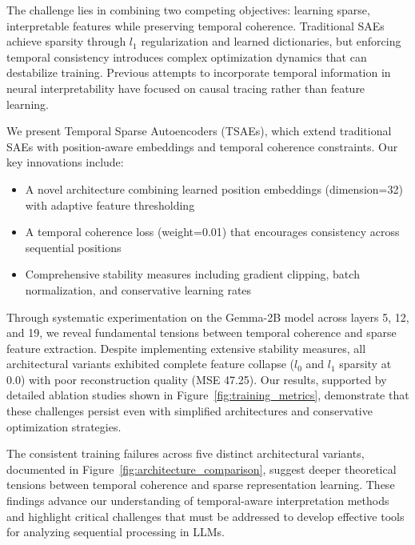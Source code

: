 The challenge lies in combining two competing objectives: learning sparse, interpretable features while preserving temporal coherence. Traditional SAEs achieve sparsity through $l_1$ regularization and learned dictionaries, but enforcing temporal consistency introduces complex optimization dynamics that can destabilize training. Previous attempts to incorporate temporal information in neural interpretability have focused on causal tracing \cite{elhage2022solu} rather than feature learning.

We present Temporal Sparse Autoencoders (TSAEs), which extend traditional SAEs with position-aware embeddings and temporal coherence constraints. Our key innovations include:
\begin{itemize}
    \item A novel architecture combining learned position embeddings (dimension=32) with adaptive feature thresholding
    \item A temporal coherence loss (weight=0.01) that encourages consistency across sequential positions
    \item Comprehensive stability measures including gradient clipping, batch normalization, and conservative learning rates
\end{itemize}

Through systematic experimentation on the Gemma-2B model across layers 5, 12, and 19, we reveal fundamental tensions between temporal coherence and sparse feature extraction. Despite implementing extensive stability measures, all architectural variants exhibited complete feature collapse ($l_0$ and $l_1$ sparsity at 0.0) with poor reconstruction quality (MSE 47.25). Our results, supported by detailed ablation studies shown in Figure~\ref{fig:training_metrics}, demonstrate that these challenges persist even with simplified architectures and conservative optimization strategies.

The consistent training failures across five distinct architectural variants, documented in Figure~\ref{fig:architecture_comparison}, suggest deeper theoretical tensions between temporal coherence and sparse representation learning. These findings advance our understanding of temporal-aware interpretation methods and highlight critical challenges that must be addressed to develop effective tools for analyzing sequential processing in LLMs.

